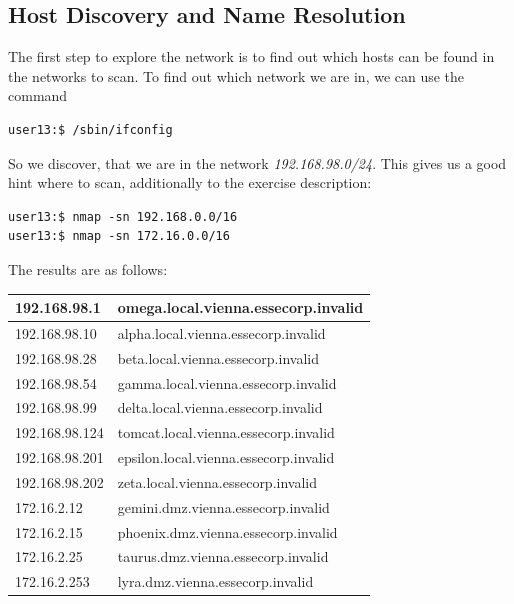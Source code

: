 \documentclass[12pt,a4paper,titlepage,oneside]{scrartcl}
\begin{document}
\subsection{Host Discovery and Name Resolution}
The first step to explore the network is to find out which hosts can be found in the networks to scan. To find out which network we are in, we can use the command

\begin{lstlisting}[style=simple]
user13:$ /sbin/ifconfig 
\end{lstlisting}

So we discover, that we are in the network \emph{192.168.98.0/24}. This gives us a good hint where to scan, additionally to the exercise description:

\begin{lstlisting}[style=simple]
user13:$ nmap -sn 192.168.0.0/16
user13:$ nmap -sn 172.16.0.0/16
\end{lstlisting}

The results are as follows:

\begin{tabular}{l | l}
\hline
192.168.98.1 & omega.local.vienna.essecorp.invalid \bigstrut \\ \hline
192.168.98.10 & alpha.local.vienna.essecorp.invalid \bigstrut \\ \hline
192.168.98.28 & beta.local.vienna.essecorp.invalid \bigstrut \\ \hline
192.168.98.54 & gamma.local.vienna.essecorp.invalid \bigstrut \\ \hline
192.168.98.99 & delta.local.vienna.essecorp.invalid \bigstrut \\ \hline
192.168.98.124 & tomcat.local.vienna.essecorp.invalid \bigstrut \\ \hline
192.168.98.201 & epsilon.local.vienna.essecorp.invalid \bigstrut \\ \hline
192.168.98.202 & zeta.local.vienna.essecorp.invalid \bigstrut \\ \hline
172.16.2.12 & gemini.dmz.vienna.essecorp.invalid \bigstrut \\ \hline
172.16.2.15 & phoenix.dmz.vienna.essecorp.invalid \bigstrut \\ \hline
172.16.2.25 & taurus.dmz.vienna.essecorp.invalid \bigstrut \\ \hline
172.16.2.253 & lyra.dmz.vienna.essecorp.invalid \bigstrut \\ \hline
\end{tabular}
\end{document}
